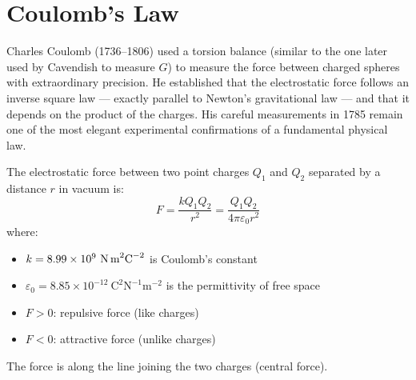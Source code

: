 \begin{diagbox}
\begin{center}
\end{center}
\end{diagbox}

\section{Coulomb's Law}

\begin{historybox}
Charles Coulomb (1736--1806) used a torsion balance
(similar to the one later used by Cavendish to measure
$G$) to measure the force between charged spheres with
extraordinary precision. He established that the
electrostatic force follows an inverse square law ---
exactly parallel to Newton's gravitational law --- and
that it depends on the product of the charges. His
careful measurements in 1785 remain one of the most
elegant experimental confirmations of a fundamental
physical law.
\end{historybox}

\begin{lawbox}
The electrostatic force between two point charges
$Q_1$ and $Q_2$ separated by a distance $r$ in
vacuum is:
\[
  F = \frac{kQ_1Q_2}{r^2}
  = \frac{Q_1Q_2}{4\pi\varepsilon_0 r^2}
\]
where:
\begin{itemize}[noitemsep]
  \item $k = 8.99\times10^9\ \text{N\,m}^2\text{C}^{-2}$
  is Coulomb's constant
  \item $\varepsilon_0 = 8.85\times10^{-12}\ \text{C}^2\text{N}^{-1}\text{m}^{-2}$
  is the permittivity of free space
  \item $F > 0$: repulsive force (like charges)
  \item $F < 0$: attractive force (unlike charges)
\end{itemize}
The force is along the line joining the two charges
(central force).
\end{lawbox}


